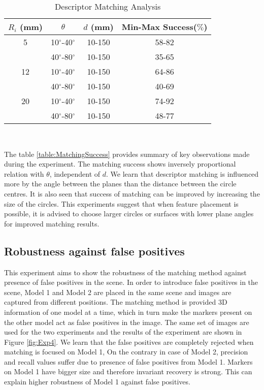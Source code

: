 \documentclass{bmvc2k}
\begin{document}
\begin{table}[tb]
\centering
\caption{Descriptor Matching Analysis } \label{table:MatchingSuccess}
\begin{tabular}{|c | c | c | c |}
\hline
$ R_i $ (mm) & $ \theta $  & $ d $ (mm) & Min-Max Success($ \% $) \\ \hline
5 & 10$ ^\circ $-40$ ^\circ $ & 10-150  & 58-82 \\
 {}& 40$ ^\circ $-80$ ^\circ $ & 10-150  & 35-65 \\ \hline
12 & 10$ ^\circ $-40$ ^\circ $ & 10-150  & 64-86 \\
{}& 40$ ^\circ $-80$ ^\circ $ & 10-150 & 40-69 \\ \hline
 20 & 10$ ^\circ $-40$ ^\circ $ & 10-150 & 74-92 \\
{} & 40$ ^\circ $-80$ ^\circ $ & 10-150 &  48-77 \\ \hline 
\end{tabular} \\
\label{tab:Exp1}
\end{table}

\par
The table \ref{table:MatchingSuccess} provides summary of key observations made during the experiment. 
The matching success shows inversely proportional relation with $ \theta $, independent of $ d $. 
We learn that descriptor matching is influenced more by the angle between the planes than the distance between the circle centres. 
It is also seen that success of matching can be improved by increasing the size of the circles. 
This experiments suggest that when feature placement is possible, it is advised to choose larger circles or surfaces with lower plane angles for improved matching results. 

\subsection{Robustness against false positives}
This experiment aims to show the robustness of the matching method against presence of false positives in the scene. 
In order to introduce false positives in the scene, Model 1 and Model 2 are placed in the same scene and images are captured from different positions. 
The matching method is provided 3D information of one model at a time, which in turn make the markers present on the other model act as false positives in the image. 
The same set of images are used for the two experiments and the results of the experiment are shown in Figure \ref{fig:Exp4}.
We learn that the false positives are completely rejected when matching is focused on Model 1, On the contrary in case of Model 2, precision and recall values suffer due to presence of false positives from Model 1. 
Markers on Model 1 have bigger size and therefore invariant recovery is strong. This can explain higher robustness of Model 1 against false positives. 
\end{document}
